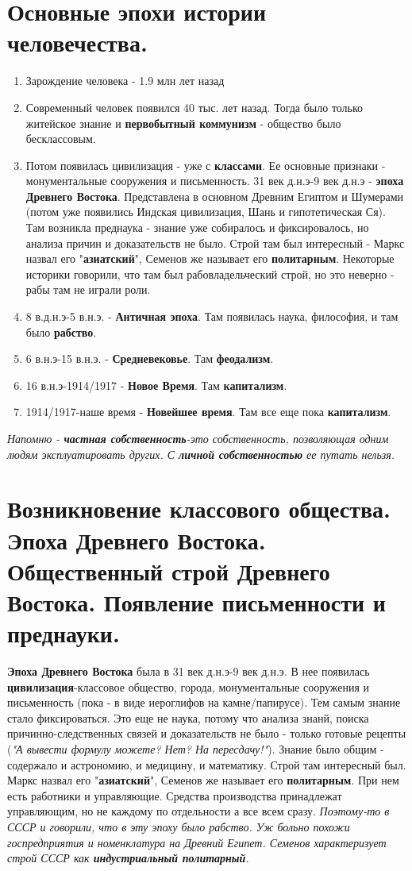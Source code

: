 \section{Основные эпохи истории человечества.}
\begin{enumerate}
\item Зарождение человека - 1.9 млн лет назад
\item Современный человек появился 40 тыс. лет назад.
Тогда было только житейское знание и \textbf{первобытный коммунизм} - общество было бесклассовым.
\item Потом появилась цивилизация  - уже с \textbf{классами}. Ее основные признаки - монументальные сооружения и письменность.
31 век д.н.э-9 век д.н.э - \textbf{эпоха Древнего Востока}. Представлена в основном Древним Египтом и Шумерами (потом уже появились Индская цивилизация, Шань и гипотетическая Ся).
Там возникла преднаука - знание уже собиралось и фиксировалось, но анализа причин и доказательств не было.
Строй там был интересный - Маркс назвал его "\textbf{азиатский}", Семенов же называет его \textbf{политарным}. Некоторые историки говорили, что там был рабовладельческий строй, но это неверно - рабы там не играли роли.
\item 8 в.д.н.э-5 в.н.э. - \textbf{Античная эпоха}. Там появилась наука, философия, и там было \textbf{рабство}.
\item 6 в.н.э-15 в.н.э. - \textbf{Средневековье}. Там \textbf{феодализм}.
\item 16 в.н.э-1914/1917 - \textbf{Новое Время}. Там \textbf{капитализм}.
\item 1914/1917-наше время - \textbf{Новейшее время}. Там все еще пока \textbf{капитализм}.
\end{enumerate}
\textit{Напомню - \textbf{частная собственность}-это собственность, позволяющая одним людям эксплуатировать других. С \textbf{личной собственностью} ее путать нельзя.}

\section{Возникновение классового общества. Эпоха Древнего Востока. Общественный строй Древнего Востока. Появление письменности и преднауки.}
\textbf{Эпоха Древнего Востока} была в 31 век д.н.э-9 век д.н.э. В нее появилась \textbf{цивилизация}-классовое общество, города, монументальные сооружения и письменность (пока - в виде иероглифов на камне/папирусе). Тем самым знание стало фиксироваться. Это еще не наука, потому что анализа знанй, поиска причинно-следственных связей и доказательств не было - только готовые рецепты (\textit{"А вывести формулу можете? Нет? На пересдачу!"}). Знание было общим - содержало и астрономию, и медицину, и математику. Строй там интересный был. Маркс назвал его "\textbf{азиатский}", Семенов же называет его \textbf{политарным}. При нем есть работники и управляющие. Средства производства принадлежат управляющим, но не каждому по отдельности а все всем сразу. \textit{Поэтому-то в СССР и говорили, что в эту эпоху было рабство. Уж больно похожи госпредприятия и номенклатура на Древний Египет. Семенов характеризует строй СССР как \textbf{индустриальный политарный}.}

